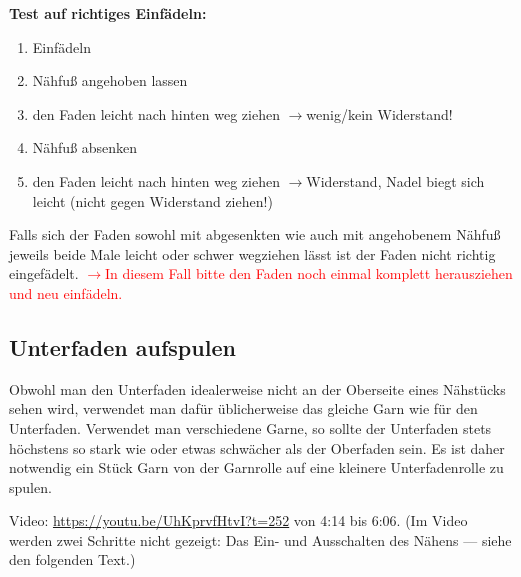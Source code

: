 \documentclass{\basedir/fablab-document}
\newcommand{\pfeil}{\ensuremath{\rightarrow}}
\begin{document}
\textbf{Test auf richtiges Einfädeln:}
\begin{enumerate}
 \item Einfädeln
 \item Nähfuß angehoben lassen
 \item den Faden leicht nach hinten weg ziehen \pfeil wenig/kein Widerstand!
 \item Nähfuß absenken
 \item den Faden leicht nach hinten weg ziehen \pfeil Widerstand, Nadel biegt sich leicht (nicht gegen Widerstand ziehen!)
\end{enumerate}
Falls sich der Faden sowohl mit abgesenkten wie auch mit angehobenem Nähfuß jeweils beide Male leicht oder schwer wegziehen lässt ist der Faden nicht richtig eingefädelt.
\newline
\textcolor{red}{\pfeil In diesem Fall bitte den Faden noch einmal komplett herausziehen und neu einfädeln.} 

\subsection{Unterfaden aufspulen}
Obwohl man den Unterfaden idealerweise nicht an der Oberseite eines Nähstücks sehen wird, verwendet man dafür üblicherweise das gleiche Garn wie für den Unterfaden.
Verwendet man verschiedene Garne, so sollte der Unterfaden stets höchstens so stark wie oder etwas schwächer als der Oberfaden sein.
Es ist daher notwendig ein Stück Garn von der Garnrolle auf eine kleinere Unterfadenrolle zu spulen.

Video: \url{https://youtu.be/UhKprvfHtvI?t=252} von 4:14 bis 6:06. (Im Video werden zwei Schritte nicht gezeigt: Das Ein- und Ausschalten des Nähens --- siehe den folgenden Text.)
\end{document}
